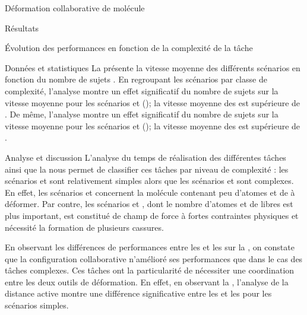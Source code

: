 \documentclass[myfrancais,ngerman,english,french]{mythesis}
\begin{document}
\begin{mychapter}{Déformation collaborative de molécule}
\begin{mysection}{Résultats}
\begin{mysubsection}{Évolution des performances en fonction de la complexité de la tâche}
\begin{mysubsubsection}{Données et statistiques}
					La  présente la vitesse moyenne  des différents scénarios  en fonction du nombre de sujets .
					En regroupant les scénarios par classe de complexité, l'analyse montre un effet significatif du nombre de sujets  sur la vitesse moyenne  pour les scénarios  et  (); la vitesse moyenne des  est supérieure de .
					De même, l'analyse montre un effet significatif du nombre de sujets  sur la vitesse moyenne  pour les scénarios  et  (); la vitesse moyenne des  est supérieure de .
				\end{mysubsubsection}
				\begin{mysubsubsection}{Analyse et discussion}
					L'analyse du temps de réalisation des différentes tâches ainsi que la  nous permet de classifier ces tâches par niveau de complexité : les scénarios  et  sont relativement simples alors que les scénarios  et  sont complexes.
					En effet, les scénarios  et  concernent la molécule \myTRPZIPPER contenant peu d'atomes et de  à déformer.
					Par contre, les scénarios  et , dont le nombre d'atomes et de  libres est plus important, est constitué de champ de force à fortes contraintes physiques et nécessité la formation de plusieurs cassures.

					En observant les différences de performances entre les  et les  sur la , on constate que la configuration collaborative n'amélioré ses performances que dans le cas des tâches complexes.
					Ces tâches ont la particularité de nécessiter une coordination entre les deux outils de déformation.
					En effet, en observant la , l'analyse de la distance active montre une différence significative entre les  et les  pour les scénarios simples.


\end{mysubsubsection}
\end{mysubsection}
\end{mysection}
\end{mychapter}
\end{document}

